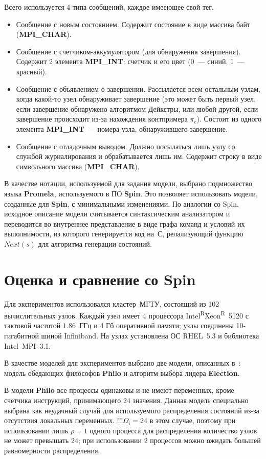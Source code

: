 \documentclass[12pt,a4paper,fleqn]{article}
\newcommand\regsign{\textsuperscript{\textcircled{\scriptsize{R}}}}
\newcommand{\Code}[1]{\textbf{\mbox{#1}}}
\begin{document}
Всего используется 4 типа сообщений, каждое имееющее свой тег.
\begin{itemize}
\item Сообщение с новым состоянием. Содержит состояние в виде массива байт
  (\Code{MPI\_CHAR}).
\item Сообщение с счетчиком-аккумулятором (для обнаружения завершения). Содержит 2 элемента
  \Code{MPI\_INT}: счетчик и его цвет (0~--- синий, 1~--- красный).
\item Сообщение с объявлением о завершении. Рассылается всем остальным узлам, когда какой-то узел
  обнаруживает завершение (это может быть первый узел, если завершение обнаружено алгоритмом
  Дейкстры, или любой другой, если завершение происходит из-за нахождения контпримера
  $\pi_e$). Состоит из одного элемента \Code{MPI\_INT}~--- номера узла, обнаружившего завершение.
\item Сообщение с отладочным выводом. Должно посылаться лишь узлу со службой журналирования и
  обрабатывается лишь им. Содержит строку в виде символьного массива (\Code{MPI\_CHAR}).
\end{itemize}

В качестве нотации, используемой для задания модели, выбрано подмножество языка \Code{Promela},
используемого в ПО \Code{Spin}. Это позволяет использовать модели, созданные для \Code{Spin}, с
минимальными изменениями. По аналогии со Spin, исходное описание модели считывается синтаксическим
анализатором и переводится во внутреннее представление в виде графа команд и условий их
выполнимости, из которого генерируется код на~С, релализующий функцию $Next(s)$ для алгоритма
генерации состояний.

\section{Оценка и сравнение со Spin}

Для экспериментов использовался кластер~МГТУ, состоящий из 102 вычислительных
узлов. Каждый узел имеет 4 процессора Intel\regsign Xeon\regsign~5120 с тактовой частотой
$1.86$~ГГц и 4 Гб оперативной памяти; узлы соединены 10-гигабитной шиной Infiniband. На
узлах установлена ОС RHEL~5.3 и библиотека Intel~MPI~3.1.

В качестве моделей для экспериментов выбрано две модели, описанных в~\cite{SPIN}: модель
обедающих философов \Code{Philo} и алгоритм выбора лидера \Code{Election}.

В модели \Code{Philo} все процессы одинаковы и не имеют переменных, кроме счетчика инструкций,
принимающего $24$ значения. Данная модель специально выбрана как неудачный случай для используемого
распределения состояний из-за отсутствия локальных переменных. !!!$\Omega_i = 24$ в этом случае,
поэтому при использовании лишь $\rho = 1$ одного процесса для распределения количество узлов не
может превышать 24; при использовании 2 процессов можно ожидать большей равномерности распределения.
\end{document}
